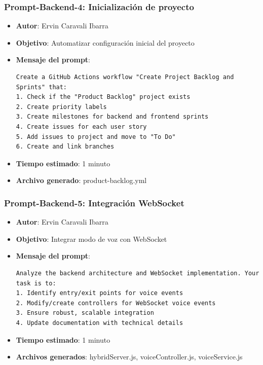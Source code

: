 \documentclass[12pt]{article}
\begin{document}
\subsubsection{Prompt-Backend-4: Inicialización de proyecto}
\begin{itemize}
    \item \textbf{Autor}: Ervin Caravali Ibarra
    \item \textbf{Objetivo}: Automatizar configuración inicial del proyecto
    \item \textbf{Mensaje del prompt}:
    \begin{verbatim}
Create a GitHub Actions workflow "Create Project Backlog and Sprints" that:
1. Check if the "Product Backlog" project exists
2. Create priority labels
3. Create milestones for backend and frontend sprints
4. Create issues for each user story
5. Add issues to project and move to "To Do"
6. Create and link branches
    \end{verbatim}
    \item \textbf{Tiempo estimado}: 1 minuto
    \item \textbf{Archivo generado}: product-backlog.yml
\end{itemize}

\subsubsection{Prompt-Backend-5: Integración WebSocket}
\begin{itemize}
    \item \textbf{Autor}: Ervin Caravali Ibarra
    \item \textbf{Objetivo}: Integrar modo de voz con WebSocket
    \item \textbf{Mensaje del prompt}:
    \begin{verbatim}
Analyze the backend architecture and WebSocket implementation. Your task is to:
1. Identify entry/exit points for voice events
2. Modify/create controllers for WebSocket voice events
3. Ensure robust, scalable integration
4. Update documentation with technical details
    \end{verbatim}
    \item \textbf{Tiempo estimado}: 1 minuto
    \item \textbf{Archivos generados}: hybridServer.js, voiceController.js, voiceService.js
\end{itemize}
\end{document}
